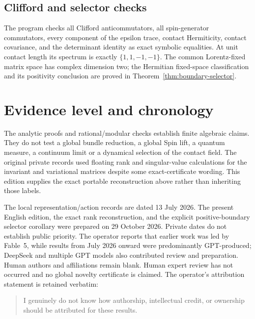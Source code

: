 \subsection{Clifford and selector checks}

The program checks all Clifford anticommutators, all spin-generator
commutators, every component of the epsilon trace, contact Hermiticity,
contact covariance, and the determinant identity as exact symbolic
equalities.
At unit contact length its spectrum is exactly $\{1,1,-1,-1\}$.
The common Lorentz-fixed matrix space has complex dimension two; the
Hermitian fixed-space classification and its positivity conclusion are
proved in Theorem~\ref{thm:boundary-selector}.

\section{Evidence level and chronology}

The analytic proofs and rational/modular checks establish finite algebraic
claims.
They do not test a global bundle reduction, a global Spin lift, a quantum
measure, a continuum limit or a dynamical selection of the contact field.
The original private records used floating rank and singular-value
calculations for the invariant and variational matrices despite some
exact-certificate wording.
This edition supplies the exact portable reconstruction above rather than
inheriting those labels.

The local representation/action records are dated 13 July 2026.
The present English edition, the exact rank reconstruction, and the explicit
positive-boundary selector corollary were prepared on 29 October 2026.
Private dates do not establish public priority.
The operator reports that earlier work was led by Fable~5, while results from
July 2026 onward were predominantly GPT-produced; DeepSeek and multiple GPT
models also contributed review and preparation.
Human authors and affiliations remain blank.
Human expert review has not occurred and no global novelty certificate is
claimed.
The operator's attribution statement is retained verbatim:
\begin{quote}
I genuinely do not know how authorship, intellectual credit, or ownership
should be attributed for these results.
\end{quote}
